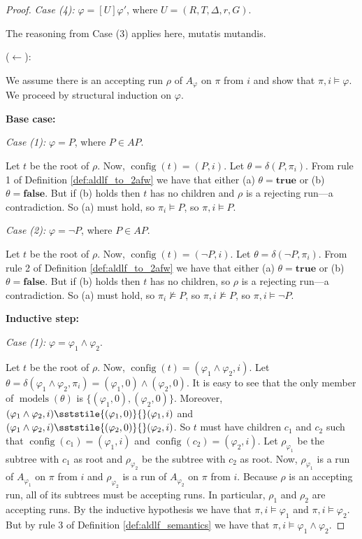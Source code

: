\documentclass{lmcs}
\theoremstyle{definition}
\newcommand{\sderives}[1]{\sststile{#1}{}}
\newcommand{\bbox}[1]{[ #1 ]}
\DeclareMathOperator{\config}{config}
\DeclareMathOperator{\?}{?}
\DeclareMathOperator{\mymodels}{models}
\begin{document}
\begin{proof}
    \textit{Case (4):} $\varphi = \bbox{U}\varphi'$, where $U = (R,T,\Delta,r,G)$.

    The reasoning from Case (3) applies here, mutatis mutandis.


    ($\leftarrow$):

    We assume there is an accepting run $\rho$ of $A_\varphi$ on $\pi$ from $i$ and show that $\pi,i \models \varphi$.
    We proceed by structural induction on $\varphi$.

    \textbf{Base case:}

    \textit{Case (1):} $\varphi = P$, where $P \in AP$.

    Let $t$ be the root of $\rho$. Now, $\config(t) = (P, i)$. Let $\theta = \delta(P,\pi_i)$. From rule 1 of
    Definition \ref{def:aldlf_to_2afw} we have that either (a) $\theta = \textbf{true}$ or (b) $\theta = \textbf{false}$.
    But if (b) holds then $t$ has no children and $\rho$ is a rejecting run\----a contradiction. So (a) must hold, so
    $\pi_i \models P$, so $\pi,i \models P$.

    \textit{Case (2):} $\varphi = \neg P$, where $P \in AP$.

    Let $t$ be the root of $\rho$. Now, $\config(t) = (\neg P,i)$. Let $\theta = \delta(\neg P,\pi_i)$.
    From rule 2 of Definition \ref{def:aldlf_to_2afw} we have that either (a) $\theta = \textbf{true}$ or
    (b) $\theta = \textbf{false}$. But if (b) holds then $t$ has no children, so $\rho$ is a rejecting run\----a contradiction.
    So (a) must hold, so $\pi_i \not\models P$, so $\pi,i \not\models P$, so $\pi,i \models \neg P$.


    \textbf{Inductive step:}

    \textit{Case (1):} $\varphi = \varphi_1 \wedge \varphi_2$.

    Let $t$ be the root of $\rho$. Now, $\config(t) = (\varphi_1 \wedge \varphi_2,i)$.
    Let $\theta = \delta(\varphi_1 \wedge \varphi_2,\pi_i) = (\varphi_1,0) \wedge (\varphi_2,0)$.
    It is easy to see that the only member of $\mymodels(\theta)$ is $\{(\varphi_1,0),(\varphi_2,0)\}$.
    Moreover, $(\varphi_1 \wedge \varphi_2,i) \sderives{(\varphi_1,0)} (\varphi_1,i)$ and
    $(\varphi_1 \wedge \varphi_2,i) \sderives{(\varphi_2,0)} (\varphi_2,i)$. So $t$ must have children
    $c_1$ and $c_2$ such that $\config(c_1) = (\varphi_1,i)$ and $\config(c_2) = (\varphi_2,i)$. Let
    $\rho_{\varphi_1}$ be the subtree with $c_1$ as root and $\rho_{\varphi_2}$ be the subtree with $c_2$
    as root. Now, $\rho_{\varphi_1}$ is a run of $A_{\varphi_1}$ on $\pi$ from $i$ and $\rho_{\varphi_2}$ is
    a run of $A_{\varphi_2}$ on $\pi$ from $i$. Because $\rho$ is an accepting run, all of its subtrees
    must be accepting runs. In particular, $\rho_1$ and $\rho_2$ are accepting runs. By the inductive hypothesis
    we have that $\pi,i \models \varphi_1$ and $\pi,i \models \varphi_2$. But by rule 3 of Definition \ref{def:aldlf_semantics}
    we have that $\pi,i \models \varphi_1 \wedge \varphi_2$.



\end{proof}
\end{document}
